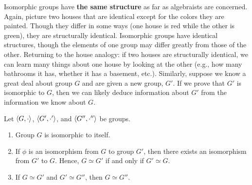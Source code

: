 Isomorphic groups have \textbf{the same structure} as far as
algebraists are concerned. Again, picture two houses that are
identical except for the colors they are painted.  Though they
differ in some ways (one house is red while the other is
green), they are structurally identical.  Isomorphic groups
have identical structures, though the elements of one group may
differ greatly from those of the other. Returning to the house
analogy: if two houses are structurally identical, we can learn
many things about one house by looking at the other (e.g., how
many bathrooms it has, whether it has a basement, etc.).
Similarly, suppose we know a great deal about group $G$ and are
given a new group, $G'$.  If we prove that $G'$ is isomorphic
to $G$, then we can likely deduce information about $G'$ from
the information we know about $G$.

\begin{thm}\label{groupisoequiv} Let $\langle G,\cdot\rangle$, $\langle G',\cdot'\rangle$, and $\langle G'',\cdot''\rangle$ be groups.

\begin{enumerate}
\item Group $G$ is isomorphic to itself.
\item If $\phi$ is an isomorphism from $G$ to group $G'$, then there exists an isomorphism from $G'$ to $G$. Hence, $G\simeq G'$ if and only if $G'\simeq G$.
\item If $G\simeq G'$ and $G'\simeq G''$, then $G\simeq G''$.
\end{enumerate}
\end{thm}



